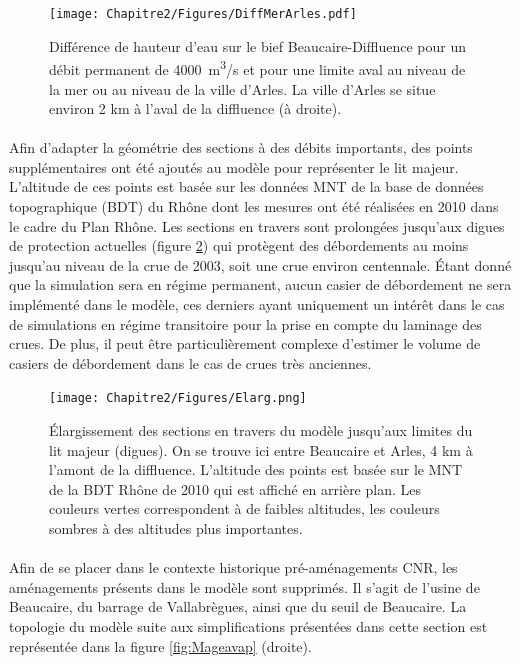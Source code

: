	\begin{figure}[h]
	\centering
		\texttt{[image: Chapitre2/Figures/DiffMerArles.pdf]}
        \caption{Différence de hauteur d'eau sur le bief Beaucaire-Diffluence pour un débit permanent de 4000~m\textsuperscript{3}/s et pour une limite aval au niveau de la mer ou au niveau de la ville d'Arles. La ville d'Arles se situe environ 2 km à l'aval de la diffluence (à droite).}
		\label{fig:DifMerArles}
	\end{figure}			 
	 	
\FloatBarrier

	\paragraph{} Afin d'adapter la géométrie des sections à des débits importants, des points supplémentaires ont été ajoutés au modèle pour représenter le lit majeur. L'altitude de ces points est basée sur les données MNT de la base de données topographique (BDT) du Rhône dont les mesures ont été réalisées en 2010 dans le cadre du Plan Rhône. Les sections en travers sont prolongées jusqu'aux digues de protection actuelles (figure \ref{fig:Elarg}) qui protègent des débordements au moins jusqu'au niveau de la crue de 2003, soit une crue environ centennale. Étant donné que la simulation sera en régime permanent, aucun casier de débordement ne sera implémenté dans le modèle, ces derniers ayant uniquement un intérêt dans le cas de simulations en régime transitoire pour la prise en compte du laminage des crues. De plus, il peut être particulièrement complexe d'estimer le volume de casiers de débordement dans le cas de crues très anciennes.
	
	\begin{figure}[h]
	\centering
		\texttt{[image: Chapitre2/Figures/Elarg.png]}
        \caption{Élargissement des sections en travers du modèle jusqu'aux limites du lit majeur (digues). On se trouve ici entre Beaucaire et Arles, 4 km à l'amont de la diffluence. L'altitude des points est basée sur le MNT de la BDT Rhône de 2010 qui est affiché en arrière plan. Les couleurs vertes correspondent à de faibles altitudes, les couleurs sombres à des altitudes plus importantes.}
		\label{fig:Elarg}
	\end{figure}		
	
	\paragraph{} Afin de se placer dans le contexte historique pré-aménagements CNR, les aménagements présents dans le modèle sont supprimés. Il s'agit de l'usine de Beaucaire, du barrage de Vallabrègues, ainsi que du seuil de Beaucaire. La topologie du modèle suite aux simplifications présentées dans cette section est représentée dans la figure \ref{fig:Mageavap} (droite).
	

